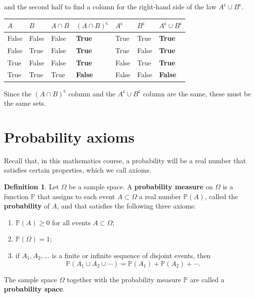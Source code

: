 \documentclass[
  a4paper,
]{book}
\providecommand{\tightlist}{%
  \setlength{\itemsep}{0pt}\setlength{\parskip}{0pt}}
\theoremstyle{definition}
\newtheorem{definition}{Definition}[chapter]
\theoremstyle{definition}
\theoremstyle{definition}
\theoremstyle{definition}
\theoremstyle{remark}
\begin{document}
and the second half to find a column for the right-hand side of the law \(A^\mathsf{c}\cup B^\mathsf{c}\).

\begin{longtable}[]{@{}
  >{\centering\arraybackslash}p{}
  >{\centering\arraybackslash}p{}
  >{\centering\arraybackslash}p{}
  >{\centering\arraybackslash}p{}
  >{\centering\arraybackslash}p{}
  >{\centering\arraybackslash}p{}
  >{\centering\arraybackslash}p{}@{}}
\toprule
\(A\) & \(B\) & \(A\cap B\) & \((A \cap B)^\mathsf{c}\) & \(A^\mathsf{c}\) & \(B^\mathsf{c}\) & \(A^\mathsf{c}\cup B^\mathsf{c}\) \\
\midrule
\endhead
False & False & False & \textbf{True} & True & True & \textbf{True} \\
False & True & False & \textbf{True} & True & False & \textbf{True} \\
True & False & False & \textbf{True} & False & True & \textbf{True} \\
True & True & True & \textbf{False} & False & False & \textbf{False} \\
\bottomrule
\end{longtable}

Since the \((A \cap B)^\mathsf{c}\) column and the \(A^\mathsf{c}\cup B^\mathsf{c}\) column are the same, these must be the same sets.

\hypertarget{axioms}{%
\section{Probability axioms}\label{axioms}}

Recall that, in this mathematics course, a probability will be a real number that satisfies certain properties, which we call axioms.

\begin{definition}
\protect\hypertarget{def:axioms}{}\label{def:axioms}Let \(\Omega\) be a sample space. A \textbf{probability measure} on \(\Omega\) is a function \(\mathbb P\) that assigns to each event \(A \subset \Omega\) a real number \(\mathbb P(A)\), called the \textbf{probability} of \(A\), and that satisfies the following three axioms:

\begin{enumerate}
\def\labelenumi{\arabic{enumi}.}
\tightlist
\item
  \(\mathbb P(A) \geq 0\) for all events \(A \subset \Omega\);
\item
  \(\mathbb P(\Omega) = 1\);
\item
  if \(A_1, A_2, \dots\) is a finite or infinite sequence of disjoint events, then
  \[ \mathbb P(A_1 \cup A_2 \cup \cdots) = \mathbb P(A_1) + \mathbb P(A_2) + \cdots . \]
\end{enumerate}

The sample space \(\Omega\) together with the probability measure \(\mathbb P\) are called a \textbf{probability space}.
\end{definition}
\end{document}

